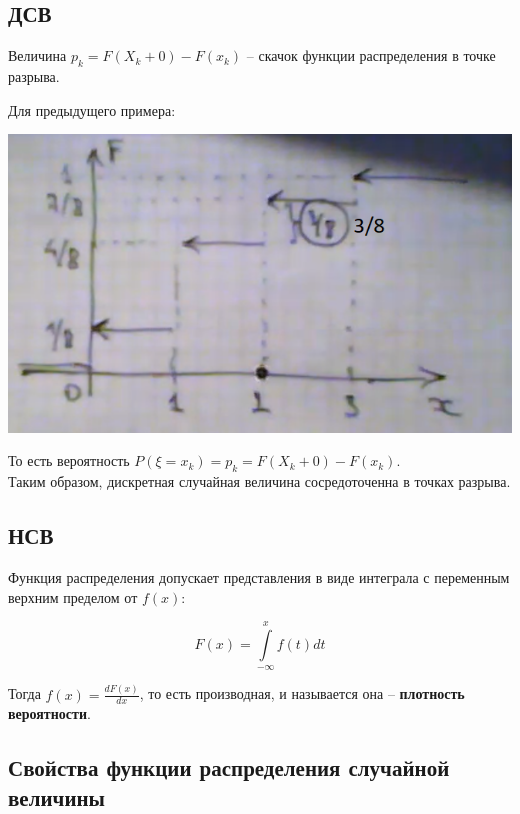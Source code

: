\documentclass{article}
\begin{document}
\subsection{ДСВ}

Величина $p_k = F(X_k + 0) - F(x_k)$ -- скачок функции распределения в точке разрыва.

Для предыдущего примера:

\begin{center}
    \includegraphics[scale=0.6]{7.png}
\end{center}

То есть вероятность $P(\xi = x_k) = p_k = F(X_k + 0) - F(x_k)$.
\\

Таким образом, дискретная случайная величина сосредоточенна в точках разрыва.

\subsection{НСВ}

Функция распределения допускает представления в виде интеграла с переменным верхним пределом от $f(x)$:

$$ F(x) = \int\limits_{-\infty}^{x} f(t)dt$$

Тогда $f(x) = \frac{dF(x)}{dx}$, то есть производная, и называется она -- \textbf{плотность вероятности}.

\subsection{Свойства функции распределения случайной величины}
\end{document}
